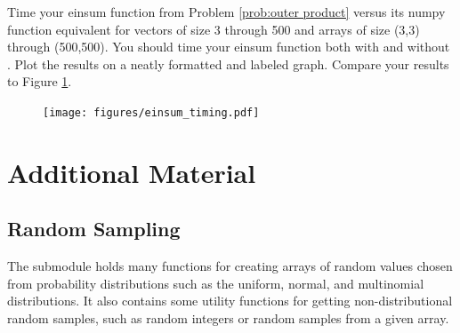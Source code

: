 \begin{problem}
Time your einsum function from Problem \ref{prob:outer product} versus its numpy function equivalent for vectors of size 3 through 500 and arrays of size (3,3) through (500,500).
You should time your einsum function both with and without .
Plot the results on a neatly formatted and labeled graph.
Compare your results to Figure \ref{fig:einsum}.
\begin{figure}[H]
    \texttt{[image: figures/einsum\_timing.pdf]}
    \caption{}
    \label{fig:einsum}
\end{figure}
\end{problem}

\newpage

\section*{Additional Material} %

\subsection*{Random Sampling} %

The submodule  holds many functions for creating arrays of random values chosen from probability distributions such as the uniform, normal, and multinomial distributions.
It also contains some utility functions for getting non-distributional random samples, such as random integers or random samples from a given array.

